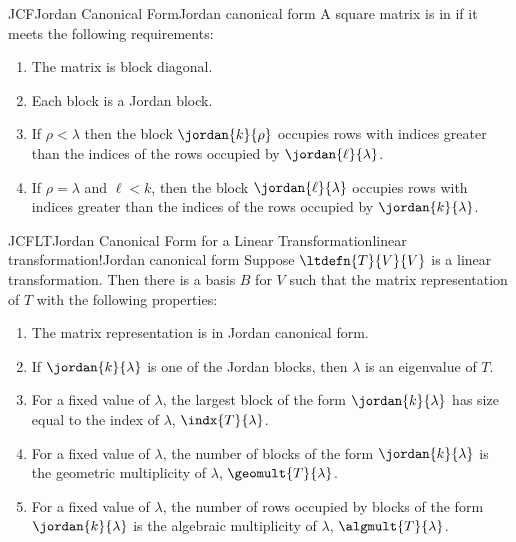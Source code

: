 %
\begin{definition}{JCF}{Jordan Canonical Form}{Jordan canonical form}
A square matrix is in  if it meets the following requirements:
\begin{enumerate}
\item The matrix is block diagonal.
\item Each block is a Jordan block.
\item If $\rho<\lambda$ then the block $\jordan{k}{\rho}$ occupies rows with indices greater than the indices of the rows occupied by $\jordan{\ell}{\lambda}$.
\item If $\rho=\lambda$ and $\ell<k$, then the block $\jordan{\ell}{\lambda}$ occupies rows with indices greater than the indices of the rows occupied by $\jordan{k}{\lambda}$.
\end{enumerate}
\end{definition}
%
\begin{theorem}{JCFLT}{Jordan Canonical Form for a Linear Transformation}{linear transformation!Jordan canonical form}
Suppose $\ltdefn{T}{V}{V}$ is a linear transformation.  Then there is a basis $B$ for $V$ such that the matrix representation of $T$ with the following properties:
\begin{enumerate}
\item The matrix representation is in Jordan canonical form.
\item If $\jordan{k}{\lambda}$ is one of the Jordan blocks, then $\lambda$ is an eigenvalue of $T$.
\item For a fixed value of $\lambda$, the largest block of the form $\jordan{k}{\lambda}$ has size equal to the index of $\lambda$, $\indx{T}{\lambda}$.
\item For a fixed value of $\lambda$, the number of blocks of the form $\jordan{k}{\lambda}$ is the geometric multiplicity of $\lambda$, $\geomult{T}{\lambda}$.
\item For a fixed value of $\lambda$, the number of rows occupied by blocks of the form $\jordan{k}{\lambda}$ is the algebraic multiplicity of $\lambda$, $\algmult{T}{\lambda}$.
\end{enumerate}
%
\end{theorem}
%
